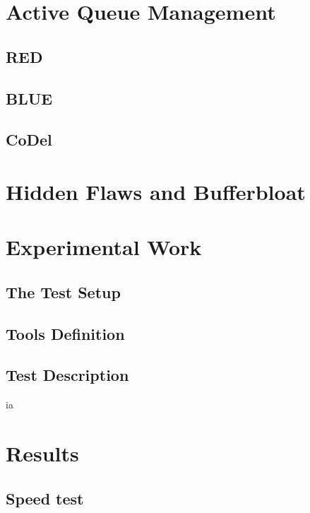 \documentclass[letter, 11pt]{article}
\theoremstyle{plain}
\theoremstyle{definition}
\begin{document}
\newpage

\section{Active Queue Management}

\subsection{RED}

\subsection{BLUE}

\subsection{CoDel}


\newpage

\section{Hidden Flaws and Bufferbloat}


\newpage

\section{Experimental Work}


\subsection{The Test Setup}


\subsection{Tools Definition}


\subsection{Test Description}

ia	
\newpage
\section{Results}


\subsection{Speed test}

\end{document}

